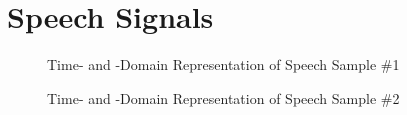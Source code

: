 \section*{Speech Signals}
\label{app:signals}

\begin{figure}[H]
\iftoggle{quick}{
    \texttt{[image: plots/signals/s1-time-stft-scr]}
}{%
\setlength{\figureheight}{3cm}
\setlength{\figurewidth}{0.8\textwidth}
\footnotesize
 \begin{subfigure}{\textwidth}
    \centering
    
    \caption{Time-Domain Representation}
 \end{subfigure}\\
 \begin{subfigure}{\textwidth}
    \centering
    
    \caption{STFT-Domain Representation}
 \end{subfigure}
}%
 \caption{Time- and -Domain Representation of Speech Sample \#1}
\end{figure}

\begin{figure}[H]
\iftoggle{quick}{
    \texttt{[image: plots/signals/s2-time-stft-scr]}
}{%
\setlength{\figureheight}{3cm}
\setlength{\figurewidth}{0.8\textwidth}
\footnotesize
 \begin{subfigure}{\textwidth}
 \centering
 
    \caption{Time-Domain Representation}
 \end{subfigure}\\
 \begin{subfigure}{\textwidth}
 \centering
    
    \caption{STFT-Domain Representation}
 \end{subfigure}
}
 \caption{Time- and -Domain Representation of Speech Sample \#2}
 \label{fig:signalRepresentation}
\end{figure}


